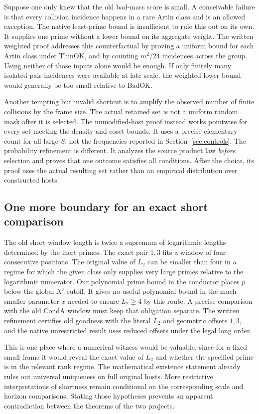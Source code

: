 \documentclass[12pt,letterpaper]{article}
\DeclareRobustCommand{\id}[1]{\mbox{\small\ttfamily #1}}
\begin{document}
Suppose one only knew that the old bad-mass score is small. A conceivable failure is that every collision incidence happens in a rare Artin class and is an allowed exception. The native least-prime bound is insufficient to rule this out on its own. It supplies one prime without a lower bound on its aggregate weight. The written weighted proof addresses this counterfactual by proving a uniform bound for each Artin class under \id{ThinOK}, and by counting \(m^2/24\) incidences across the group. Using neither of those inputs alone would be enough. If only finitely many isolated pair incidences were available at late scale, the weighted lower bound would generally be too small relative to \id{BadOK}.

Another tempting but invalid shortcut is to amplify the observed number of finite collisions by the frame size. The actual retained set is not a uniform random mask after it is selected. The unmodified-host proof instead works pointwise for every set meeting the density and coset bounds. It uses a precise elementary count for all large \(S\), not the frequencies reported in Section~\ref{sec:controls}. The probability refinement is different. It analyzes the source product law \emph{before} selection and proves that one outcome satisfies all conditions. After the choice, its proof uses the actual resulting set rather than an empirical distribution over constructed hosts.

\subsection{One more boundary for an exact short comparison}

The old short window length is twice a supremum of logarithmic lengths determined by the inert primes. The exact pair \(1,3\) fits a window of four consecutive positions. The original value of \(L_2\) can be smaller than four in a regime for which the given class only supplies very large primes relative to the logarithmic numerator. Our polynomial prime bound in the conductor places \(p\) below the global \(X'\) cutoff. It gives no useful polynomial bound in the much smaller parameter \(x\) needed to ensure \(L_2\ge4\) by this route. A precise comparison with the old \id{CondA} window must keep that obligation separate. The written refinement certifies old goodness with the literal \(L_2\) and geometric offsets \(1,3\), and the native unrestricted result uses reduced offsets under the legal long order.

This is one place where a numerical witness would be valuable, since for a fixed small frame it would reveal the exact value of \(L_2\) and whether the specified prime is in the relevant rank regime. The mathematical existence statement already rules out universal uniqueness on full original hosts. More restrictive interpretations of shortness remain conditional on the corresponding scale and horizon comparisons. Stating those hypotheses prevents an apparent contradiction between the theorems of the two projects.
\end{document}
